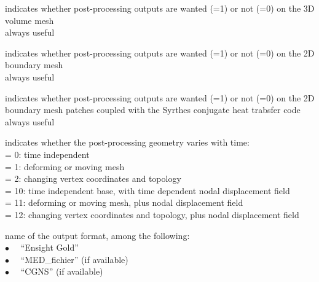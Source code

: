 {indicates whether post-processing outputs are wanted (=1) or not (=0) 
on the 3D volume mesh\\
always useful}

{indicates whether post-processing outputs are wanted (=1) or not (=0) 
on the 2D boundary mesh\\
always useful}

 {indicates whether post-processing outputs are wanted (=1) or not (=0) 
 on the 2D boundary mesh patches coupled with the Syrthes conjugate
 heat trabsfer code\\
 always useful}
 
 {indicates whether the post-processing geometry varies with time:\\
 \hspace*{1.3cm}= 0: time independent\\
 \hspace*{1.3cm}= 1: deforming or moving mesh\\
 \hspace*{1.3cm}= 2: changing vertex coordinates and topology\\
 \hspace*{1.3cm}= 10: time independent base, with time dependent nodal displacement field\\
 \hspace*{1.3cm}= 11: deforming or moving mesh, plus nodal displacement field\\
 \hspace*{1.3cm}= 12: changing vertex coordinates and topology, plus nodal displacement field}
 
 {name of the output format, among the following:\\
 \hspace*{1.3cm}$\bullet\quad$ ``Ensight Gold''\\
 \hspace*{1.3cm}$\bullet\quad$ ``MED\_fichier'' (if available)\\
 \hspace*{1.3cm}$\bullet\quad$ ``CGNS'' (if available)}
 
